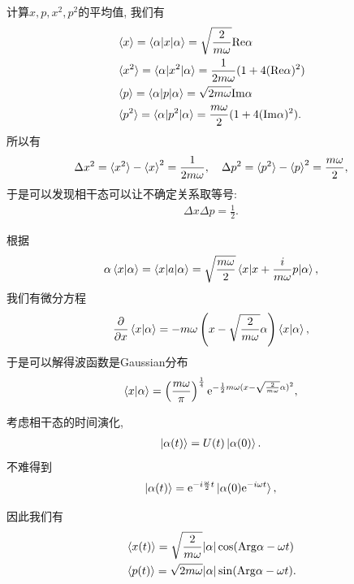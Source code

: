 计算$x, p, x^2, p^2$的平均值, 我们有
\begin{align}
    &\braket{x}=\braket{\alpha|x|\alpha}=\sqrt{\frac2{m\omega}}\mathrm{Re}\alpha\\
    &\braket{x^2}=\braket{\alpha|x^2|\alpha}=\frac1{2m\omega}(1+4(\mathrm{Re}\alpha)^2)\\
    &\braket{p}=\braket{\alpha|p|\alpha}=\sqrt{2m\omega}\mathrm{Im}\alpha\\
    &\braket{p^2}=\braket{\alpha|p^2|\alpha}=\frac{m\omega}{2}(1+4(\mathrm{Im}\alpha)^2).
\end{align}
所以有
\begin{align}
    \Delta x^2=\braket{x^2}-\braket{x}^2=\frac1{2m\omega}, \quad\Delta p^2=\braket{p^2}-\braket{p}^2=\frac{m\omega}{2},
\end{align}
于是可以发现相干态可以让不确定关系取等号:
\begin{align}
    \Delta x\Delta p=\frac12.
\end{align}

根据
\begin{align}
    \alpha\braket{x|\alpha}=\braket{x|a|\alpha}=\sqrt{\frac{m\omega}2}\braket{x|x+\frac i{m\omega}p|\alpha},
\end{align}
我们有微分方程
\begin{align}
    \frac{\partial }{\partial x}\braket{x|\alpha}=-m\omega\left(x-\sqrt{\frac 2{m\omega}}\alpha\right)\braket{x|\alpha},
\end{align}
于是可以解得波函数是Gaussian分布
\begin{align}
    \braket{x|\alpha}=\left(\frac{m\omega}\pi\right)^{\frac14}\mathrm e^{-\frac12m\omega(x-\sqrt{\frac 2{m\omega}}\alpha)^2},
\end{align}

考虑相干态的时间演化, 
\begin{align}
    \ket{\alpha(t)}=U(t)\ket{\alpha(0)}.
\end{align}
不难得到
\begin{align}
    \ket{\alpha(t)}=\mathrm e^{-i\frac\omega2 t}\ket{\alpha(0)\mathrm e^{-i\omega t}},
\end{align}

因此我们有
\begin{align}
    &\braket{x(t)}=\sqrt{\frac2{m\omega}}|\alpha|\cos(\mathrm{Arg}\alpha-\omega t)\\
    &\braket{p(t)}=\sqrt{2m\omega}|\alpha|\sin(\mathrm{Arg}\alpha-\omega t).
\end{align}

